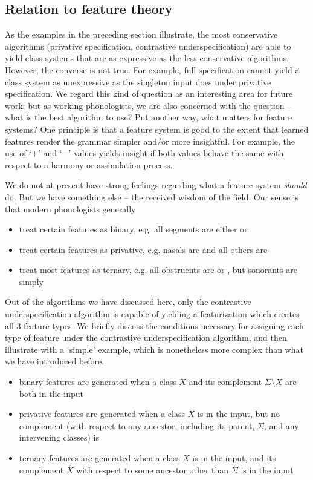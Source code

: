 \documentclass[11pt, oneside]{article}   	%
\begin{document}
\subsection{Relation to feature theory}

As the examples in the preceding section illustrate, the most conservative algorithms (privative specification, contrastive underspecification) are able to yield class systems that are as expressive as the less conservative algorithms. However, the converse is not true. For example, full specification cannot yield a class system as unexpressive as the singleton input does under privative specification. We regard this kind of question as an interesting area for future work; but as working phonologists, we are also concerned with the question -- what is the best algorithm to use? Put another way, what matters for feature systems? One principle is that a feature system is good to the extent that learned features render the grammar simpler and/or more insightful. For example, the use of `$+$' and `$-$' values yields insight if both values behave the same with respect to a harmony or assimilation process.

We do not at present have strong feelings regarding what a feature system \textit{should} do. But we have something else -- the received wisdom of the field. Our sense is that modern phonologists generally \begin{itemize}
    \item treat certain features as binary, e.g. all segments are either  or 
    \item treat certain features as privative, e.g. nasals are  and all others are 
    \item treat most features as ternary, e.g. all obstruents are  or , but sonorants are simply 
    \end{itemize}
Out of the algorithms we have discussed here, only the contrastive underspecification algorithm is capable of yielding a featurization which creates all 3 feature types. We briefly discuss the conditions necessary for assigning each type of feature under the contrastive underspecification algorithm, and then illustrate with a `simple' example, which is nonetheless more complex than what we have introduced before. \begin{itemize}
    \item binary features are generated when a class $X$ and its complement $\Sigma \setminus X$ are both in the input
    \item privative features are generated when a class $X$ is in the input, but no complement (with respect to any ancestor, including its parent, $\Sigma$, and any intervening classes) is
    \item ternary features are generated when a class $X$ is in the input, and its complement $\overline{X}$ with respect to some ancestor other than $\Sigma$ is in the input
    \end{itemize}
\end{document}

